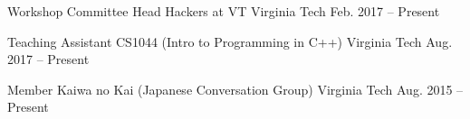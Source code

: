 

\begin{cvhonors}

  \cvhonor
    {Workshop Committee Head} %
    {Hackers at VT} %
    {Virginia Tech} %
    {Feb. 2017 – Present} %

  \cvhonor
    {Teaching Assistant} %
    {CS1044 (Intro to Programming in C++)} %
    {Virginia Tech} %
    {Aug. 2017 – Present} %

  \cvhonor
    {Member} %
    {Kaiwa no Kai (Japanese Conversation Group)} %
    {Virginia Tech} %
    {Aug. 2015 – Present} %

\end{cvhonors}
